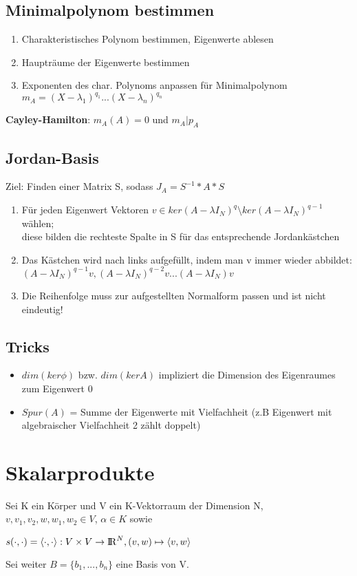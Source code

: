 \documentclass[10pt,a4paper]{article}
\def\realnumbers{{\rm I\!R}}
\begin{document}
	\subsection{Minimalpolynom bestimmen}
	\begin{enumerate}
		\item Charakteristisches Polynom bestimmen, Eigenwerte ablesen
		\item Haupträume der Eigenwerte bestimmen
		\item Exponenten des char. Polynoms anpassen für Minimalpolynom $m_A = (X - \lambda_1)^{q_1} ... (X - \lambda_n)^{q_n}$
	\end{enumerate}
	\textbf{Cayley-Hamilton}: $m_A(A) = 0$ und $m_A|p_A$

	\subsection{Jordan-Basis}
	Ziel: Finden einer Matrix S, sodass $J_A = S^{-1} * A * S$
	\begin{enumerate}
		\item Für jeden Eigenwert Vektoren $v \in ker(A - \lambda I_N)^q \setminus ker(A - \lambda I_N)^{q - 1}$ wählen;\\diese bilden die rechteste Spalte in S für das entsprechende Jordankästchen
		\item Das Kästchen wird nach links aufgefüllt, indem man v immer wieder abbildet:\\$(A - \lambda I_N)^{q - 1}v, (A - \lambda I_N)^{q - 2}v ... (A - \lambda I_N)v$
		\item Die Reihenfolge muss zur aufgestellten Normalform passen und ist nicht eindeutig!
	\end{enumerate}

	\subsection{Tricks}
		\begin{itemize}
			\item $dim(ker \phi)$ bzw. $dim(ker A)$ impliziert die Dimension des Eigenraumes zum Eigenwert 0
			\item $Spur(A)$ = Summe der Eigenwerte mit Vielfachheit (z.B Eigenwert mit algebraischer Vielfachheit 2 zählt doppelt)
		\end{itemize}
	
	\section{Skalarprodukte}
	Sei K ein Körper und V ein K-Vektorraum der Dimension N, $v, v_1, v_2, w, w_1, w_2 \in V$, $\alpha \in K$ sowie
	\begin{center}
		$s(\cdot,\cdot) = \langle\cdot,\cdot\rangle: V \times V \rightarrow \realnumbers^N, (v, w) \mapsto \langle v, w\rangle$
	\end{center}
	Sei weiter $B = \{b_1, ..., b_n\}$ eine Basis von V.
	
\end{document}
